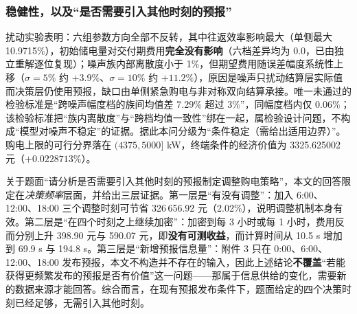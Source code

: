 \subsubsection{稳健性，以及“是否需要引入其他时刻的预报”}

扰动实验表明：六组参数方向全部不反转，其中往返效率影响最大（单侧最大 10.9715\%），初始储电量对交付期费用\textbf{完全没有影响}（六档差异均为 0.0，已由独立重解逐位复现）；噪声族内部离散度小于 1\%，但期望费用随误差幅度系统性上移（$\sigma=5\%$ 约 $+3.9\%$、$\sigma=10\%$ 约 $+11.2\%$），原因是噪声只扰动结算层实际值而决策层仍使用预报，缺口由单侧紧急购电与非对称双向结算承接。唯一未通过的检验标准是“跨噪声幅度档的族间均值差 7.29\% 超过 3\%”，同幅度档内仅 0.06\%；该检验标准把“族内离散度”与“跨档均值一致性”绑在一起，属检验设计问题，不构成“模型对噪声不稳定”的证据。据此本问分级为“条件稳定（需给出适用边界）”。购电上限的可行分界落在 $(4375,5000]$ kW，终端条件的经济价值为 3325.625002 元（$+0.0228713\%$）。

关于题面“请分析是否需要引入其他时刻的预报制定调整购电策略”，本文的回答限定在\emph{决策频率}层面，并给出三层证据。第一层是“有没有调整”：加入 6:00、12:00、18:00 三个调整时刻可节省 326\,656.92 元（2.02\%），说明调整机制本身有效。第二层是“在四个时刻之上继续加密”：加密到每 3 小时或每 1 小时，费用反而分别上升 398.90 元与 590.07 元，即\textbf{没有可测收益}，而计算时间从 10.5 s 增加到 69.9 s 与 194.8 s。第三层是“新增预报信息量”：附件 3 只在 0:00、6:00、12:00、18:00 发布预报，本文不构造并不存在的输入，因此上述结论\textbf{不覆盖}“若能获得更频繁发布的预报是否有价值”这一问题——那属于信息供给的变化，需要新的数据来源才能回答。综合而言，在现有预报发布条件下，题面给定的四个决策时刻已经足够，无需引入其他时刻。

